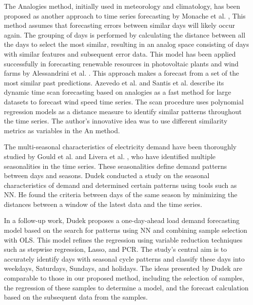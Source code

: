\documentclass[journal, twoside]{IEEEtran}
\begin{document}
The Analogies method, initially used in meteorology and climatology, has been proposed as another approach to time series forecasting by Monache et al. \cite{Monache2013},
This method assumes that forecasting errors between similar days will likely occur again.
The grouping of days is performed by calculating the distance between all the days to select the most similar, resulting in an analog space consisting of days with similar features and subsequent error data. 
This model has been applied successfully in forecasting renewable resources in photovoltaic plants and wind farms by Alessandrini et al. \cite{Alessandrini2014, Alessandrini2015}. 
This approach makes a forecast from a set of the most similar past predictions.
Azevedo et al. \cite{CostaEA2021} and Santis et al. \cite{Santis2023} describe its dynamic time scan forecasting based on analogies as a fast method for large datasets to forecast wind speed time series. The scan procedure uses polynomial regression models as a distance measure to identify similar patterns throughout the time series. The author's innovative idea was to use different similarity metrics as variables in the An method.

The multi-seasonal characteristics of electricity demand
have been thoroughly studied by Gould et al. \cite{Gould2008} and Livera et al. \cite{Alysha2011}, 
who have identified multiple seasonalities in the time series.
These seasonalities define demand patterns between days and seasons.
Dudek \cite{Dudek2015a} conducted a study on the seasonal characteristics of demand and determined certain patterns using tools such as \ac{NN}. He found the criteria between days of the same season by minimizing the distances between a window of the latest data and the time series.

In a follow-up work, Dudek \cite{Dudek2016} proposes a one-day-ahead
load demand forecasting model based on the search for patterns using
\ac{NN} and combining sample selection with \ac{OLS}. 
This model refines the regression using variable reduction techniques such as stepwise regression, Lasso, and \ac{PCR}. 
The study's central aim is to accurately identify days with seasonal cycle patterns and classify these days into weekdays, Saturdays, Sundays, and holidays. %
The ideas presented by Dudek \cite{Dudek2016} are comparable to those in our proposed method, including the selection of samples, the regression of these samples to determine a model, and the forecast calculation based on the subsequent data from the samples.
\end{document}
